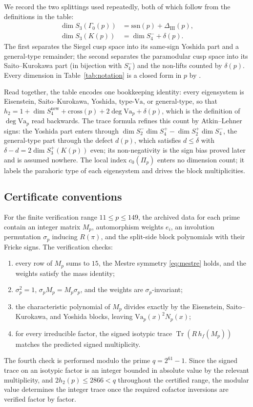 \documentclass[10pt,a4paper]{amsart}
\newcommand{\Va}{\mathrm{Va}}
\newcommand{\snew}{S^{\mathrm{new}}}
\providecommand{\Va}{\mathrm{Va}}
\providecommand{\snew}{S^{\mathrm{new}}}
\begin{document}
	We record the two splittings used repeatedly, both of which follow from the
	definitions in the table:
	\begin{align}
		\dim S_3(\Gamma_0(p)) &= \mathrm{ssn}(p)+\Delta_{\mathrm{III}}(p),\\
		\dim S_3(K(p)) &= \dim S_4^-+\delta(p).
	\end{align}
	The first separates the Siegel cusp space into its same-sign Yoshida part
	and a general-type remainder; the second separates the paramodular cusp
	space into its Saito--Kurokawa part (in bijection with $S_4^-$) and the
	non-lifts counted by $\delta(p)$. Every dimension in
	Table~\ref{tab:notation} is a closed form in $p$ by
	\cite{Ibukiyama2007dim,Ibukiyama-dim}.
	
	Read together, the table encodes one bookkeeping identity: every
	eigensystem is Eisenstein, Saito--Kurokawa, Yoshida, type-$\Va$, or
	general-type, so that
	$h_2=1+\dim\snew_4+\mathrm{cross}(p)+2\deg\Va_p+\delta(p)$, which is the
	definition of $\deg\Va_p$ read backwards. The trace formula refines this
	count by Atkin--Lehner signs: the Yoshida part enters through
	$\dim S_2^-\dim S_4^+-\dim S_2^+\dim S_4^-$, the general-type part through
	the defect $d(p)$, which satisfies $d\le\delta$ with
	$\delta-d=2\dim S_3^+(K(p))$ even; its non-negativity is the sign bias
	proved later and is assumed nowhere. The local index $c_0(\Pi_p)$ enters
	no dimension count; it labels the parahoric type of each eigensystem and
	drives the block multiplicities.
	
	\subsection{Certificate conventions}
	\label{ss:certificate-conventions}
	
	For the finite verification range $11\le p\le149$, the archived data for
	each prime contain an integer matrix $M_p$, automorphism weights $e_i$, an
	involution permutation $\sigma_p$ inducing $R(\pi)$, and the split-side
	block polynomials with their Fricke signs. The verification checks:
	\begin{enumerate}[label=\textup{(Cert\arabic*)},leftmargin=3.7em]
		\item every row of $M_p$ sums to $15$, the Mestre symmetry
		\eqref{eq:mestre} holds, and the weights satisfy the mass identity;
		\item $\sigma_p^2=1$, $\sigma_pM_p=M_p\sigma_p$, and the weights are
		$\sigma_p$-invariant;
		\item the characteristic polynomial of $M_p$ divides exactly by the
		Eisenstein, Saito--Kurokawa, and Yoshida blocks, leaving
		$\Va_p(x)^2N_p(x)$;
		\item for every irreducible factor, the signed isotypic trace
		$\operatorname{Tr}(R\,h_f(M_p))$ matches the predicted signed multiplicity.
	\end{enumerate}
	The fourth check is performed modulo the prime $q=2^{61}-1$. Since the
	signed trace on an isotypic factor is an integer bounded in absolute value
	by the relevant multiplicity, and $2h_2(p)\le2866<q$ throughout the
	certified range, the modular value determines the integer trace once the
	required cofactor inversions are verified factor by factor.
	
\end{document}
